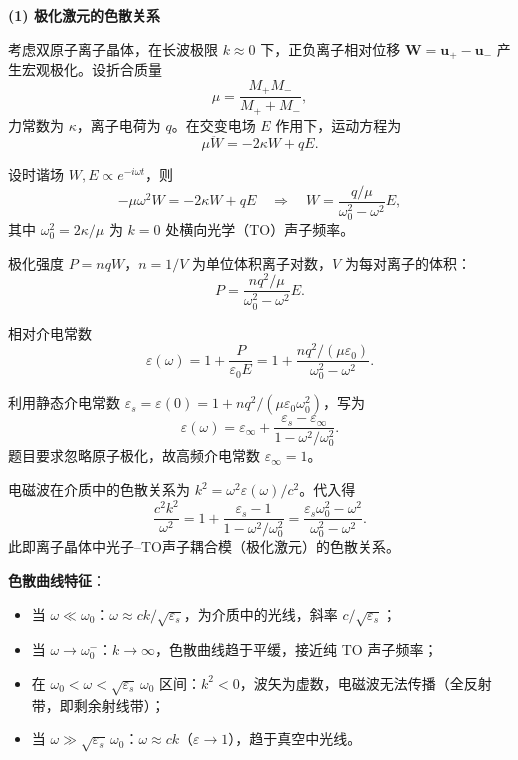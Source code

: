 \begin{derivationbox}[标准解题过程]
\textbf{(1) 极化激元的色散关系}

考虑双原子离子晶体，在长波极限 $k\approx0$ 下，正负离子相对位移 $\bm{W}=\bm{u}_+-\bm{u}_-$ 产生宏观极化。设折合质量
\begin{equation}
\mu=\frac{M_+M_-}{M_++M_-},
\end{equation}
力常数为 $\kappa$，离子电荷为 $q$。在交变电场 $E$ 作用下，运动方程为
\begin{equation}
\mu\ddot{W}=-2\kappa W+qE.
\end{equation}

设时谐场 $W,E\propto e^{-i\omega t}$，则
\begin{equation}
-\mu\omega^2W=-2\kappa W+qE
\quad\Longrightarrow\quad
W=\frac{q/\mu}{\omega_0^2-\omega^2}E,
\end{equation}
其中 $\omega_0^2=2\kappa/\mu$ 为 $k=0$ 处横向光学（TO）声子频率。

极化强度 $P=nqW$，$n=1/V$ 为单位体积离子对数，$V$ 为每对离子的体积：
\begin{equation}
P=\frac{nq^2/\mu}{\omega_0^2-\omega^2}E.
\end{equation}

相对介电常数
\begin{equation}
\varepsilon(\omega)=1+\frac{P}{\varepsilon_0E}
=1+\frac{nq^2/(\mu\varepsilon_0)}{\omega_0^2-\omega^2}.
\end{equation}

利用静态介电常数 $\varepsilon_s=\varepsilon(0)=1+nq^2/(\mu\varepsilon_0\omega_0^2)$，写为
\begin{equation}
\varepsilon(\omega)=\varepsilon_\infty+\frac{\varepsilon_s-\varepsilon_\infty}{1-\omega^2/\omega_0^2}.
\end{equation}
题目要求忽略原子极化，故高频介电常数 $\varepsilon_\infty=1$。

电磁波在介质中的色散关系为 $k^2=\omega^2\varepsilon(\omega)/c^2$。代入得
\begin{equation}
\frac{c^2k^2}{\omega^2}=1+\frac{\varepsilon_s-1}{1-\omega^2/\omega_0^2}
=\frac{\varepsilon_s\omega_0^2-\omega^2}{\omega_0^2-\omega^2}.
\end{equation}
此即离子晶体中光子--TO声子耦合模（极化激元）的色散关系。

\textbf{色散曲线特征}：
\begin{itemize}
    \item 当 $\omega\ll\omega_0$：$\omega\approx ck/\sqrt{\varepsilon_s}$，为介质中的光线，斜率 $c/\sqrt{\varepsilon_s}$；
    \item 当 $\omega\to\omega_0^-$：$k\to\infty$，色散曲线趋于平缓，接近纯 TO 声子频率；
    \item 在 $\omega_0<\omega<\sqrt{\varepsilon_s}\,\omega_0$ 区间：$k^2<0$，波矢为虚数，电磁波无法传播（全反射带，即剩余射线带）；
    \item 当 $\omega\gg\sqrt{\varepsilon_s}\,\omega_0$：$\omega\approx ck$（$\varepsilon\to1$），趋于真空中光线。
\end{itemize}


\end{derivationbox}

